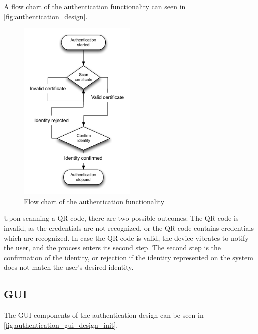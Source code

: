 A flow chart of the authentication functionality can seen in \autoref{fig:authentication_design}.
\begin{figure}[!h]
	\centering
	\includegraphics[width=0.5\textwidth]{gfx/authentication_design.pdf}
	\caption{Flow chart of the authentication functionality}
	\label{fig:authentication_design}
\end{figure}

Upon scanning a QR-code, there are two possible outcomes: The QR-code is invalid, as the credentials are not recognized, or the QR-code contains credentials which are recognized.
In case the QR-code is valid, the device vibrates to notify the user, and the process enters its second step. The second step is the confirmation of the identity, or rejection if the identity represented on the system does not match the user's desired identity.

\subsection{GUI}
The GUI components of the authentication design can be seen in \autoref{fig:authentication_gui_design_init}.

